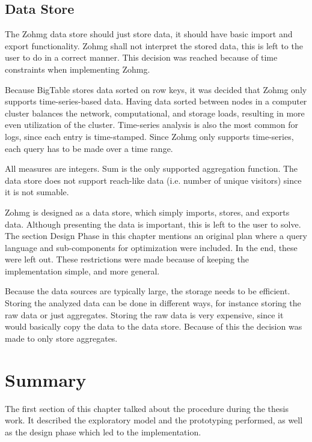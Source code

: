 \subsection*{Data Store}

The Zohmg data store should just store data, it should have basic import
and export functionality. Zohmg shall not interpret the stored data, this is
left to the user to do in a correct manner. This decision was reached because of
time constraints when implementing Zohmg.

Because BigTable stores data sorted on row keys, it was decided that Zohmg only
supports time-series-based data. Having data sorted between nodes in a computer
cluster balances the network, computational, and storage loads, resulting in
more even utilization of the cluster. Time-series analysis is also the most
common for logs, since each entry is time-stamped. \cite{discoveringweb} Since
Zohmg only supports time-series, each query has to be made over a time range.

All measures are integers. Sum is the only supported aggregation function. The
data store does not support reach-like data (i.e. number of unique visitors)
since it is not sumable.

Zohmg is designed as a data store, which simply imports, stores, and exports
data. Although presenting the data is important, this is left to the user to
solve. The section Design Phase in this chapter mentions an original plan where
a query language and sub-components for optimization were included. In the end,
these were left out. These restrictions were made because of keeping the
implementation simple, and more general.

Because the data sources are typically large, the storage needs to be efficient.
Storing the analyzed data can be done in different ways, for instance storing
the raw data or just aggregates. Storing the raw data is very expensive, since
it would basically copy the data to the data store. Because of this the decision
was made to only store aggregates.


\section*{Summary}

The first section of this chapter talked about the procedure during the thesis
work. It described the exploratory model and the prototyping performed, as well
as the design phase which led to the implementation.

